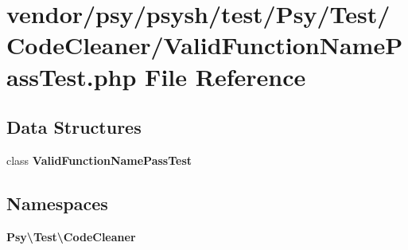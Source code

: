 \section{vendor/psy/psysh/test/\+Psy/\+Test/\+Code\+Cleaner/\+Valid\+Function\+Name\+Pass\+Test.php File Reference}
\label{_valid_function_name_pass_test_8php}
\subsection*{Data Structures}
\begin{DoxyCompactItemize}
\item 
class {\bf Valid\+Function\+Name\+Pass\+Test}
\end{DoxyCompactItemize}
\subsection*{Namespaces}
\begin{DoxyCompactItemize}
\item 
 {\bf Psy\textbackslash{}\+Test\textbackslash{}\+Code\+Cleaner}
\end{DoxyCompactItemize}
